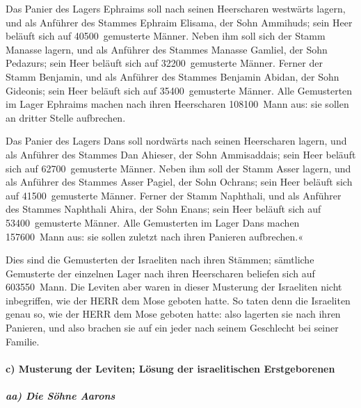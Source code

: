 Das Panier des Lagers Ephraims soll nach seinen
Heerscharen westwärts lagern, und als Anführer des Stammes Ephraim
Elisama, der Sohn Ammihuds; sein Heer beläuft sich auf
40500~gemusterte Männer. Neben ihm soll sich der Stamm
Manasse lagern, und als Anführer des Stammes Manasse Gamliel, der Sohn
Pedazurs; sein Heer beläuft sich auf 32200~gemusterte
Männer. Ferner der Stamm Benjamin, und als Anführer des
Stammes Benjamin Abidan, der Sohn Gideonis; sein Heer
beläuft sich auf 35400~gemusterte Männer. Alle
Gemusterten im Lager Ephraims machen nach ihren Heerscharen 108100~Mann
aus: sie sollen an dritter Stelle aufbrechen.

Das Panier des Lagers Dans soll nordwärts nach seinen
Heerscharen lagern, und als Anführer des Stammes Dan Ahieser, der Sohn
Ammisaddais; sein Heer beläuft sich auf 62700~gemusterte
Männer. Neben ihm soll der Stamm Asser lagern, und als
Anführer des Stammes Asser Pagiel, der Sohn Ochrans; sein
Heer beläuft sich auf 41500~gemusterte Männer. Ferner der
Stamm Naphthali, und als Anführer des Stammes Naphthali Ahira, der Sohn
Enans; sein Heer beläuft sich auf 53400~gemusterte
Männer. Alle Gemusterten im Lager Dans machen 157600~Mann
aus: sie sollen zuletzt nach ihren Panieren aufbrechen.«

Dies sind die Gemusterten der Israeliten nach ihren
Stämmen; sämtliche Gemusterte der einzelnen Lager nach ihren Heerscharen
beliefen sich auf 603550~Mann. Die Leviten aber waren in
dieser Musterung der Israeliten nicht inbegriffen, wie der HERR dem Mose
geboten hatte. So taten denn die Israeliten genau so, wie
der HERR dem Mose geboten hatte: also lagerten sie nach ihren Panieren,
und also brachen sie auf ein jeder nach seinem Geschlecht bei seiner
Familie.

\hypertarget{c-musterung-der-leviten-luxf6sung-der-israelitischen-erstgeborenen}{%
\paragraph{c) Musterung der Leviten; Lösung der israelitischen
Erstgeborenen}\label{c-musterung-der-leviten-luxf6sung-der-israelitischen-erstgeborenen}}

\hypertarget{aa-die-suxf6hne-aarons}{%
\subparagraph{aa) Die Söhne Aarons}\label{aa-die-suxf6hne-aarons}}

